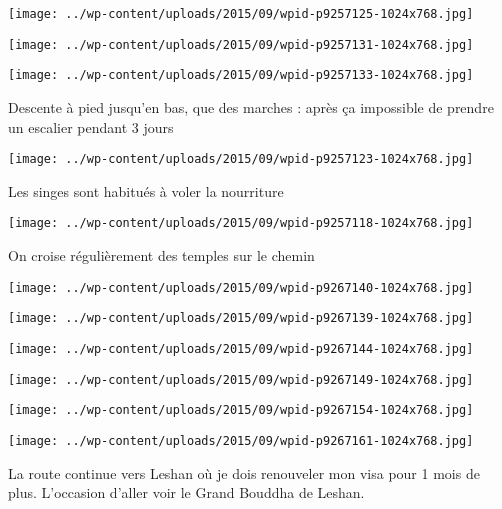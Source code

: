  \newline
\centerline{\texttt{[image: ../wp-content/uploads/2015/09/wpid-p9257125-1024x768.jpg]} } 
 \newline
 \newline
\centerline{\texttt{[image: ../wp-content/uploads/2015/09/wpid-p9257131-1024x768.jpg]} } 
 \newline
 \newline
\centerline{\texttt{[image: ../wp-content/uploads/2015/09/wpid-p9257133-1024x768.jpg]} } 
 \newline
 Descente à pied jusqu'en bas, que des marches : après ça impossible de prendre un escalier pendant 3 jours \newline
 \newline
\centerline{\texttt{[image: ../wp-content/uploads/2015/09/wpid-p9257123-1024x768.jpg]} } 
 \newline
 Les singes sont habitués à voler la nourriture \newline
 \newline
\centerline{\texttt{[image: ../wp-content/uploads/2015/09/wpid-p9257118-1024x768.jpg]} } 
 \newline
 On croise régulièrement des temples sur le chemin \newline
 \newline
\centerline{\texttt{[image: ../wp-content/uploads/2015/09/wpid-p9267140-1024x768.jpg]} } 
 \newline
 \newline
\centerline{\texttt{[image: ../wp-content/uploads/2015/09/wpid-p9267139-1024x768.jpg]} } 
 \newline
 \newline
\centerline{\texttt{[image: ../wp-content/uploads/2015/09/wpid-p9267144-1024x768.jpg]} } 
 \newline
 \newline
\centerline{\texttt{[image: ../wp-content/uploads/2015/09/wpid-p9267149-1024x768.jpg]} } 
 \newline
 \newline
\centerline{\texttt{[image: ../wp-content/uploads/2015/09/wpid-p9267154-1024x768.jpg]} } 
 \newline
 \newline
\centerline{\texttt{[image: ../wp-content/uploads/2015/09/wpid-p9267161-1024x768.jpg]} } 
 \newline
 La route continue vers Leshan où je dois renouveler mon visa pour 1 mois de plus. L'occasion d'aller voir le Grand Bouddha de Leshan. \newline
